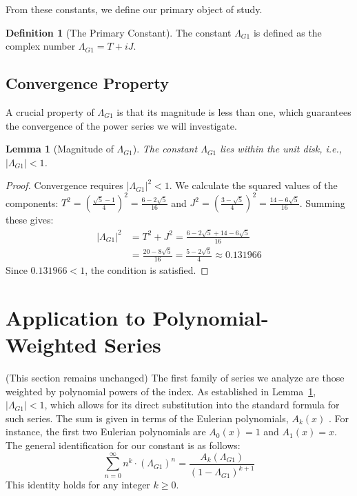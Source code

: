 \documentclass{amsart}
\theoremstyle{plain}
\newtheorem{lemma}[theorem]{Lemma}
\theoremstyle{definition}
\newtheorem{definition}[theorem]{Definition}
\theoremstyle{remark}
\newcommand{\LambdaG}{\Lambda_{G1}}
\begin{document}
From these constants, we define our primary object of study.
\begin{definition}[The Primary Constant]
The constant $\LambdaG$ is defined as the complex number $\LambdaG = T+iJ$.
\end{definition}

\subsection{Convergence Property}
A crucial property of $\LambdaG$ is that its magnitude is less than one, which guarantees the convergence of the power series we will investigate.

\begin{lemma}[Magnitude of $\LambdaG$]
\label{lem:convergence}
The constant $\LambdaG$ lies within the unit disk, i.e., $|\LambdaG| < 1$.
\end{lemma}
\begin{proof}
Convergence requires $|\LambdaG|^2 < 1$. We calculate the squared values of the components:
$T^2 = \left(\frac{\sqrt{5}-1}{4}\right)^2 = \frac{6-2\sqrt{5}}{16}$ and $J^2 = \left(\frac{3-\sqrt{5}}{4}\right)^2 = \frac{14-6\sqrt{5}}{16}$.
Summing these gives:
\begin{align*}
    |\LambdaG|^2 &= T^2+J^2 = \frac{6-2\sqrt{5} + 14-6\sqrt{5}}{16} \\
                 &= \frac{20-8\sqrt{5}}{16} = \frac{5-2\sqrt{5}}{4} \approx 0.131966
\end{align*}
Since $0.131966 < 1$, the condition is satisfied.
\end{proof}

\section{Application to Polynomial-Weighted Series}
(This section remains unchanged)
The first family of series we analyze are those weighted by polynomial powers of the index. As established in Lemma~\ref{lem:convergence}, $|\LambdaG|<1$, which allows for its direct substitution into the standard formula for such series. The sum is given in terms of the Eulerian polynomials, $A_k(x)$ \cite{AandS}. For instance, the first two Eulerian polynomials are $A_0(x)=1$ and $A_1(x)=x$. The general identification for our constant is as follows:
$$ \sum_{n=0}^{\infty} n^k \cdot (\LambdaG)^n = \frac{A_k(\LambdaG)}{(1-\LambdaG)^{k+1}} $$
This identity holds for any integer $k \ge 0$.
\end{document}
